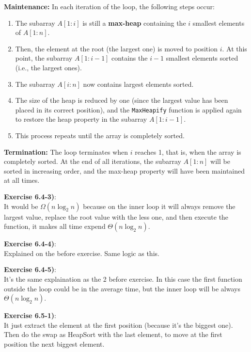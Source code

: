 \documentclass{article}
\newcounter{exercise}[section]   %
\begin{document}
\textbf{Maintenance:} In each iteration of the loop, the following steps occur:

\begin{enumerate}
    \item The subarray \( A[1:i] \) is still a \textbf{max-heap} containing the \( i \)
    smallest elements of \( A[1:n] \).
    \item Then, the element at the root (the largest one) is moved to position \( i \).
    At this point, the subarray \( A[1:i-1] \) contains the \( i-1 \) smallest elements
    sorted (i.e., the largest ones).
    \item The subarray \( A[i:n] \) now contains largest elements sorted.
    \item The size of the heap is reduced by one (since the largest value has been placed
    in its correct position), and the \texttt{MaxHeapify} function is applied again to
    restore the heap property in the subarray \( A[1:i-1] \).
    \item This process repeats until the array is completely sorted.
\end{enumerate}

\textbf{Termination:} The loop terminates when \( i \) reaches 1, that is, when the
array is completely sorted. At the end of all iterations, the subarray \( A[1:n] \)
will be sorted in increasing order, and the max-heap property will have been maintained
at all times.

\textbf{Exercise 6.4-3)}:\\
It would be \(\Omega(n \log_2 n)\) because on the inner loop it will always remove the largest
value, replace the root value with the less one, and then execute the function, it makes 
all time expend \(\Theta(n \log_2 n)\).

\textbf{Exercise 6.4-4)}:\\
Explained on the before exercise. Same logic as this.

\textbf{Exercise 6.4-5)}:\\
It's the same explaination as the 2 before exercise. In this case the first function outside
the loop could be in the average time, but the inner loop will be always \(\Theta(n \log_2 n)\).

\textbf{Exercise 6.5-1)}:\\
It just extract the element at the first position (because it's the biggest one). Then do
the swap as HeapSort with the last element, to move at the first position the next biggest
element.
\end{document}

